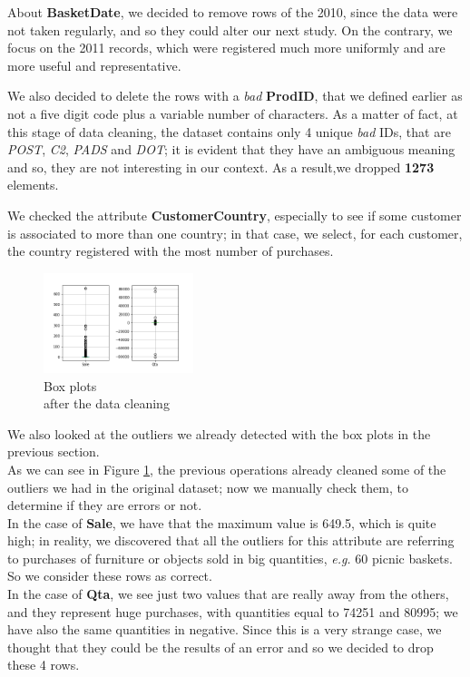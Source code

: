 About \textbf{BasketDate}, we decided to remove rows of the 2010, since the data were not taken regularly, and so they could alter our next study. On the contrary, we focus on the 2011 records, which were registered much more uniformly and are more useful and representative.

We also decided to delete the rows with a \emph{bad} \textbf{ProdID}, that we defined earlier as not a five digit code plus a variable number of characters. As a matter of fact, at this stage of data cleaning, the dataset contains only 4 unique \emph{bad} IDs, that are \emph{POST}, \emph{C2}, \emph{PADS} and \emph{DOT}; it is evident that they have an ambiguous meaning and so, they are not interesting in our context. As a result,we dropped \textbf{1273} elements.

We checked the attribute \textbf{CustomerCountry}, especially to see if some customer is associated to more than one country; in that case, we select, for each customer, the country registered with the most number of purchases.

\pagebreak
\begin{figure}
\centering
\captionsetup{justification=centering}
\includegraphics[width=0.39\textwidth]{img/boxplot_after.png}
\caption{Box plots\\ after the data cleaning}
\label{fig:boxplot_after}
\end{figure}

We also looked at the outliers we already detected with the box plots in the previous section.\\
As we can see in Figure \ref{fig:boxplot_after}, the previous operations already cleaned some of the outliers we had in the original dataset; now we manually check them, to determine if they are errors or not.\\
In the case of \textbf{Sale}, we have that the maximum value is 649.5, which is quite high; in reality, we discovered that all the outliers for this attribute are referring to purchases of furniture or objects sold in big quantities, \emph{e.g.} 60 picnic baskets. So we consider these rows as correct.\\
In the case of \textbf{Qta}, we see just two values that are really away from the others, and they represent huge purchases, with quantities equal to 74251 and 80995; we have also the same quantities in negative. Since this is a very strange case, we thought that they could be the results of an error and so we decided to drop these 4 rows.

